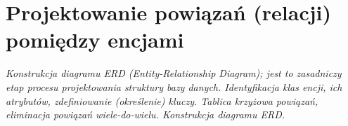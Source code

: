 \section{Projektowanie powiązań (relacji) pomiędzy encjami}

\textit{Konstrukcja diagramu ERD
(Entity-Relationship Diagram); jest to zasadniczy etap procesu projektowania struktury
bazy danych. Identyfikacja klas encji, ich atrybutów, zdefiniowanie (określenie) kluczy.
Tablica krzyżowa powiązań, eliminacja powiązań wiele-do-wielu. Konstrukcja diagramu
ERD.} \\


